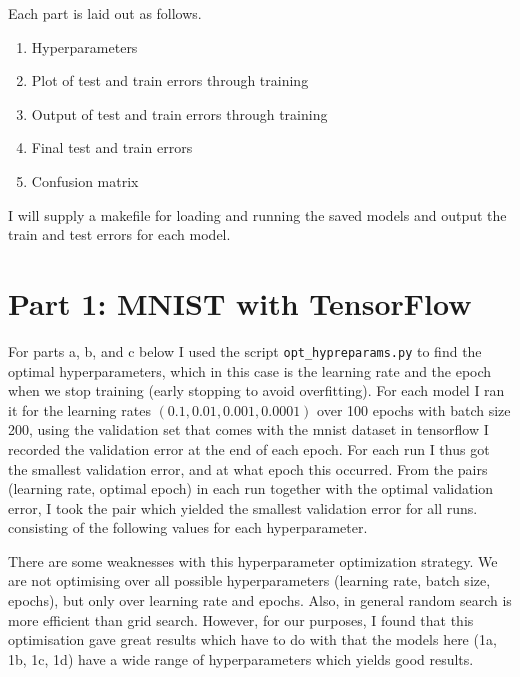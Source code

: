 \documentclass{article}
\begin{document}
\maketitle

\newpage

Each part is laid out as follows.

\begin{enumerate}[label=(\roman*)]
\item Hyperparameters
\item Plot of test and train errors through training
\item Output of test and train errors through training
\item Final test and train errors
\item Confusion matrix
\end{enumerate}

I will supply a makefile for loading and running the saved models and output the
train and test errors for each model.

\section{Part 1: MNIST with TensorFlow}

For parts a, b, and c below I used the script \texttt{opt\_hypreparams.py} to find
the optimal hyperparameters, which in this case is the learning rate and the
epoch when we stop training (early stopping to avoid overfitting). For each
model I ran it for the learning rates $(0.1, 0.01, 0.001, 0.0001)$ over 100
epochs with batch size 200, using the
validation set that comes with the mnist dataset in tensorflow I recorded the
validation error at the end of each epoch. For each run I thus got the smallest
validation error, and at what epoch this occurred. From the pairs (learning
rate, optimal epoch) in each run together with the optimal validation error, I
took the pair which yielded the smallest validation error for all runs.
consisting of the following values for each hyperparameter.

There are some weaknesses with this hyperparameter optimization strategy. We are
not optimising over all possible hyperparameters (learning rate, batch size,
epochs), but only over learning rate and epochs. Also, in general random search
is more efficient than grid search. However, for our purposes, I found that this
optimisation gave great results which have to do with that the models here
(1a, 1b, 1c, 1d) have a wide range of hyperparameters which yields good results.
\end{document}
